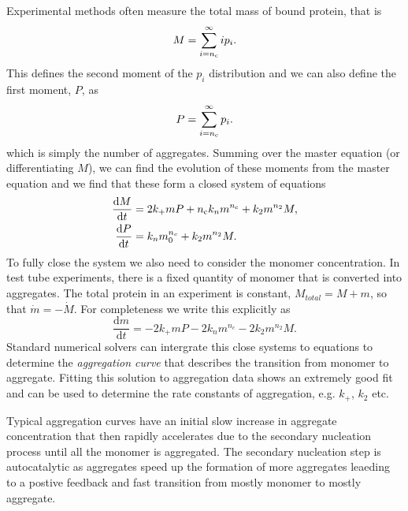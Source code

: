 Experimental methods  often measure the total mass of bound protein, that is
\begin{equation}
    M = \sum_{i=n_{\mathrm{c}}}^{\infty}i p_i.
\end{equation}
This defines the second moment of the $p_i$ distribution and we can also define the first moment, $P$, as 
\begin{equation}
    P = \sum_{i=n_{\mathrm{c}}}^{\infty} p_i.
\end{equation}
which is simply the number of aggregates. Summing over the master equation (or differentiating $M$), we can find the evolution of these moments from the master equation and  we find that these form a closed system of equations
\begin{align}
    \frac{\text{d}M}{\text{d}t} &= 2 k_+m P + n_{\mathrm{c}} k_n m^{n_{\mathrm{c}}}+ k_2 m^{n_2} M, \label{eq:Mvitro} \\
    \frac{\text{d}P}{\text{d}t} &= k_n m_0^{n_c}+k_2 m^{n_2} M. \label{eq:Pvitro}
\end{align}
To fully close the system we also need to consider the monomer concentration. In test tube experiments, there is a fixed quantity of monomer that is converted into aggregates. The total protein in an experiment is constant, $M_{total} = M + m$, so that $\dot{m}=-\dot{M}$. For completeness we write this explicitly as 
\begin{equation}
    \frac{\text{d}m}{\text{d}t} = -2 k_+m P - 2k_n m^{n_c} - 2k_2 m^{n_2} M. \label{eq:mvitro}
\end{equation}
Standard numerical solvers can intergrate this close systems to equations to determine the \textit{aggregation curve} that describes the transition from monomer to aggregate. Fitting this solution to aggregation data shows an extremely good fit and can be used to determine the rate constants of aggregation, e.g. $k_+$, $k_2$ etc.


Typical aggregation curves have an initial slow increase in aggregate concentration that then rapidly accelerates due to the secondary nucleation process until all the monomer is aggregated. The secondary nucleation step is autocatalytic as aggregates speed up the formation of more aggregates leaeding to a postive feedback and fast transition from mostly monomer to mostly aggregate.

